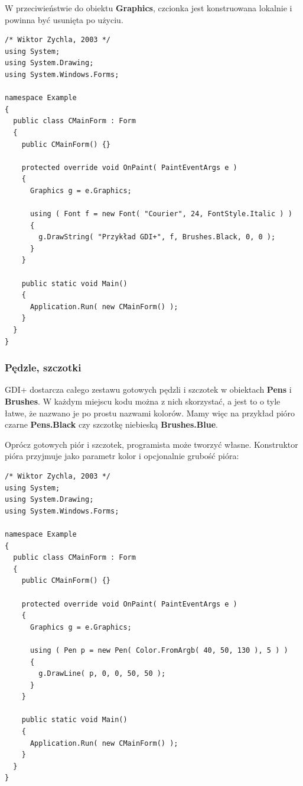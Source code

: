 W przeciwieństwie do obiektu {\bf Graphics}, czcionka jest konstruowana lokalnie i powinna być usunięta
po użyciu. 

\begin{scriptsize}
\begin{verbatim}
/* Wiktor Zychla, 2003 */
using System;
using System.Drawing;
using System.Windows.Forms;

namespace Example
{
  public class CMainForm : Form
  {  
    public CMainForm() {}

    protected override void OnPaint( PaintEventArgs e )
    {
      Graphics g = e.Graphics;

      using ( Font f = new Font( "Courier", 24, FontStyle.Italic ) )
      {
        g.DrawString( "Przykład GDI+", f, Brushes.Black, 0, 0 );
      }
    }

    public static void Main()
    {    
      Application.Run( new CMainForm() );
    }
  }
}
\end{verbatim}
\end{scriptsize}

\subsubsection{Pędzle, szczotki}

GDI+ dostarcza całego zestawu gotowych pędzli i szczotek w obiektach {\bf Pens} i {\bf Brushes}.
W każdym miejscu kodu można z nich skorzystać, a jest to o tyle łatwe, że nazwano je po prostu
nazwami kolorów. Mamy więc na przykład pióro czarne {\bf Pens.Black} czy szczotkę niebieską
{\bf Brushes.Blue}.

Oprócz gotowych piór i szczotek, programista może tworzyć własne. Konstruktor pióra przyjmuje jako parametr
kolor i opcjonalnie grubość pióra:

\begin{scriptsize}
\begin{verbatim}
/* Wiktor Zychla, 2003 */
using System;
using System.Drawing;
using System.Windows.Forms;

namespace Example
{
  public class CMainForm : Form
  {  
    public CMainForm() {}

    protected override void OnPaint( PaintEventArgs e )
    {
      Graphics g = e.Graphics;

      using ( Pen p = new Pen( Color.FromArgb( 40, 50, 130 ), 5 ) )
      {
        g.DrawLine( p, 0, 0, 50, 50 );
      }
    }

    public static void Main()
    {    
      Application.Run( new CMainForm() );
    }
  }
}
\end{verbatim}
\end{scriptsize}

